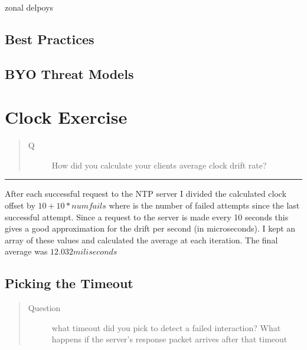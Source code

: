 \documentclass[letterpaper,10pt,english]{sphinxmanual}
\begin{document}
zonal delpoys
\textasciigrave{}


\section{Best Practices}
\label{\detokenize{aws_beyondelevennines_talk:best-practices}}

\section{BYO Threat Models}
\label{\detokenize{aws_beyondelevennines_talk:byo-threat-models}}

\chapter{Clock Exercise}
\label{\detokenize{clock_exercise/clock_exercise:clock-exercise}}\label{\detokenize{clock_exercise/clock_exercise::doc}}\begin{quote}\begin{description}
\item[{Q}] \leavevmode
How did you calculate your clients average clock drift rate?

\end{description}\end{quote}


\bigskip\hrule\bigskip


After each successful request to the NTP server I divided the
calculated clock offset by \(10 + 10*numfails\) where
 is the number of failed attempts since the last
successful attempt. Since a request to the server is made every 10
seconds this gives a good approximation for the drift per second (in microseconds).
I kept an array of these values and calculated the average at each iteration.
The final average was \(12.032miliseconds\)


\section{Picking the Timeout}
\label{\detokenize{clock_exercise/clock_exercise:picking-the-timeout}}\begin{quote}\begin{description}
\item[{Question}] \leavevmode
what timeout did you pick to detect a failed interaction? What
happens if the server’s response packet arrives after that timeout

\end{description}\end{quote}
\end{document}
